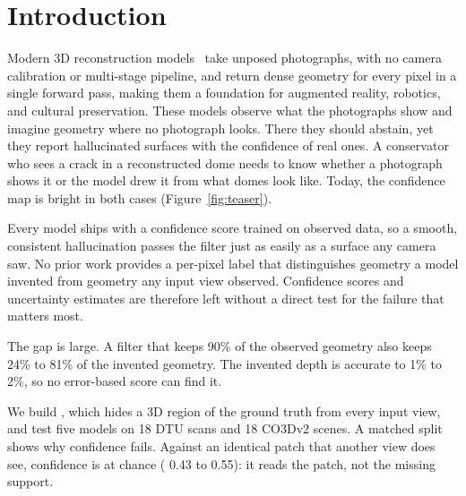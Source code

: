 \documentclass[10pt,twocolumn,letterpaper]{article}
\begin{document}
\section{Introduction}
\label{sec:intro}
Modern 3D reconstruction models~\cite{dust3r,mast3r,vggt,pi3,mapanything,da3} take unposed photographs, with no camera calibration or multi-stage pipeline, and return dense geometry for every pixel in a single forward pass, making them a foundation for augmented reality, robotics, and cultural preservation.
These models observe what the photographs show and imagine geometry where no photograph looks. There they should abstain, yet they report hallucinated surfaces with the confidence of real ones.
A conservator who sees a crack in a reconstructed dome needs to know whether a photograph shows it or the model drew it from what domes look like. Today, the confidence map is bright in both cases (Figure~\ref{fig:teaser}).

Every model ships with a confidence score trained on observed data, so a smooth, consistent hallucination passes the filter just as easily as a surface any camera saw.
No prior work provides a per-pixel label that distinguishes geometry a model invented from geometry any input view observed. Confidence scores and uncertainty estimates are therefore left without a direct test for the failure that matters most.

The gap is large. A filter that keeps 90\% of the observed geometry also keeps 24\% to 81\% of the invented geometry. The invented depth is accurate to 1\% to 2\%, so no error-based score can find it.

We build \bench{}, which hides a 3D region of the ground truth from every input view, and test five models on 18 DTU scans and 18 CO3Dv2 scenes. A matched split shows why confidence fails. Against an identical patch that another view does see, confidence is at chance (\auroc{} 0.43 to 0.55): it reads the patch, not the missing support.
\end{document}
